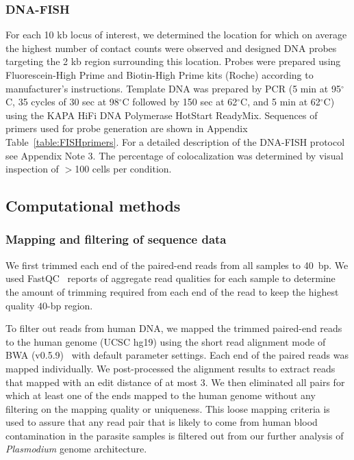 \subsubsection{DNA-FISH}
For each 10 kb locus of interest, we determined the location for which on average
the highest number of contact counts were observed and designed DNA probes targeting
the 2 kb region surrounding this location. Probes were prepared using Fluorescein-High
Prime and Biotin-High Prime kits (Roche) according to manufacturer's instructions.
Template DNA was prepared by PCR (5 min at 95$^\circ$C, 35 cycles of 30 sec at
98$^\circ$C followed by 150 sec at 62$^\circ$C, and 5 min at 62$^\circ$C) using
the KAPA HiFi DNA Polymerase HotStart ReadyMix. Sequences of primers used for probe
generation are shown in Appendix Table~\ref{table:FISHprimers}. For a detailed
description of the DNA-FISH protocol see Appendix Note 3. The percentage of
colocalization was determined by visual inspection of $>$100 cells per condition.

\subsection{Computational methods}

\subsubsection{Mapping and filtering of sequence data}
\label{met:mapping}
We first trimmed each end of the paired-end reads from all samples to 40~bp.
We used FastQC~\citep{andrews:fastqc}
reports of aggregate read qualities for each sample to determine the amount
of trimming required from each end of the read to keep the highest quality
$40$-bp region.

To filter out reads from human DNA, we mapped the trimmed paired-end reads to
the human genome (UCSC hg19) using the short read alignment mode of BWA (v0.5.9)~\citep{li:fast} 
with default parameter settings. Each end of the paired reads was mapped
individually. We post-processed the alignment results to extract reads that
mapped with an edit distance of at most 3. We then eliminated all pairs for
which at least one of the ends mapped to the human genome without any filtering
on the mapping quality or uniqueness. This loose mapping criteria is used to
assure that any read pair that is likely to come from human blood contamination
in the parasite samples is filtered out from our further analysis of
{\em Plasmodium} genome architecture.

